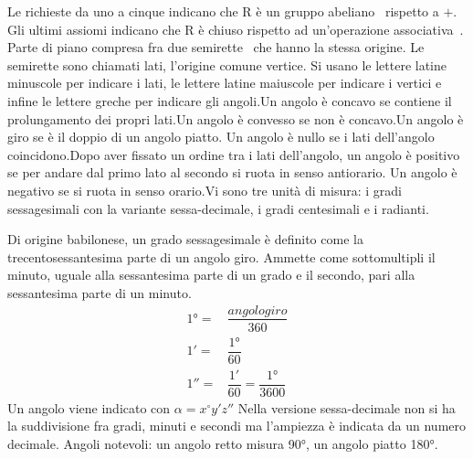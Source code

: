 Le richieste da uno a cinque indicano che R è un gruppo abeliano\pointsto~ rispetto a $+$. Gli ultimi assiomi indicano che R è chiuso rispetto ad un'operazione associativa\pointsto~. \cite{Herstein1989}
Parte di piano compresa fra due semirette\pointsto~ che hanno la stessa origine. Le semirette sono chiamati lati, l'origine comune vertice. Si usano le lettere latine minuscole per indicare i lati, le lettere latine maiuscole per indicare i vertici e infine le lettere greche per indicare gli angoli.Un angolo è concavo se contiene il prolungamento dei propri lati.Un angolo è convesso se non è concavo.Un angolo è giro se è il doppio di un angolo piatto.
Un angolo è nullo se i lati dell'angolo coincidono.Dopo aver fissato un ordine tra i lati dell'angolo, un angolo è positivo se per andare dal primo lato al secondo si ruota in senso antiorario. Un angolo è negativo se si ruota in senso orario.Vi sono tre unità di misura: i gradi sessagesimali con la variante sessa-decimale, i gradi centesimali e i radianti.
\begin{minitoc}
\end{minitoc}
Di origine babilonese,
un grado sessagesimale è definito come la trecentosessantesima parte di un angolo giro. Ammette come sottomultipli il minuto, uguale alla sessantesima parte di un grado e il secondo, pari alla sessantesima parte di un minuto.
\begin{align*}
\ang{1}=&\dfrac{angolo giro}{360}\\
\ang{;1;}=&\dfrac{\ang{1}}{60}\\
\ang{;;1}=&\dfrac{\ang{;1;}}{60}=\dfrac{\ang{1}}{3600}
\end{align*}
Un angolo viene indicato con $\alpha=x^\circ y'z''$
Nella versione sessa-decimale non si ha 
la suddivisione fra gradi, minuti e secondi ma l'ampiezza è indicata da un numero decimale. Angoli notevoli: un angolo retto misura \ang{90;;}, un angolo piatto \ang{180;;}.
